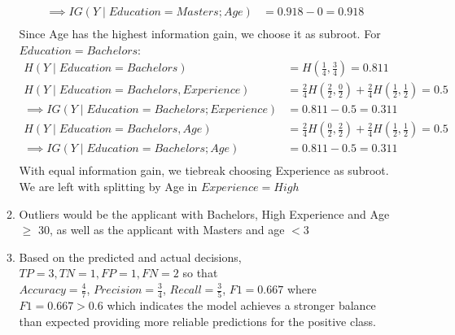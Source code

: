 \documentclass[12pt, a4paper]{article}
\begin{document}
\begin{enumerate}[\Alph*.]
\begin{enumerate}[\arabic*.]
\begin{align*}
          \implies IG(Y\mid Education = Masters; Age) &= 0.918 - 0 = 0.918\\
        \end{align*}
        Since Age has the highest information gain, we choose it as subroot. For $Education = Bachelors$:
        \begin{align*}
          H(Y\mid Education = Bachelors) &= H(\frac{1}{4}, \frac{3}{4}) = 0.811\\
          H(Y\mid Education = Bachelors, Experience) &= \frac{2}{4}H(\frac{2}{2}, \frac{0}{2}) + \frac{2}{4}H(\frac{1}{2}, \frac{1}{2}) = 0.5\\
          \implies IG(Y\mid Education = Bachelors; Experience) &= 0.811 - 0.5 = 0.311\\
          H(Y\mid Education = Bachelors, Age) &= \frac{2}{4}H(\frac{0}{2}, \frac{2}{2}) + \frac{2}{4}H(\frac{1}{2}, \frac{1}{2}) = 0.5\\
          \implies IG(Y\mid Education = Bachelors; Age) &= 0.811 - 0.5 = 0.311\\
        \end{align*}
        With equal information gain, we tiebreak choosing Experience as subroot. We are left with splitting by Age in $Experience = High$
        \begin{center}
        \end{center}

      \item Outliers would be the applicant with Bachelors, High Experience and Age $\geq$ 30, as well as the applicant with Masters and age $< 3$
        \begin{center}
        \end{center}

      \item Based on the predicted and actual decisions, $TP = 3, TN = 1, FP = 1, FN = 2$ so that\\
        $Accuracy = \frac{4}{7}$, $Precision = \frac{3}{4}$, $Recall = \frac{3}{5}$, $F1 = 0.667$ where $F1 = 0.667 > 0.6$ which indicates the model achieves a stronger balance than expected providing more reliable predictions for the positive class.
 
    \end{enumerate}


\end{enumerate}
\end{document}
